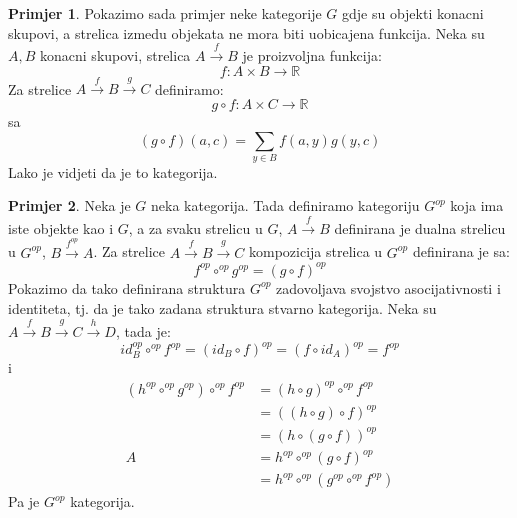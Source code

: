 \documentclass[11pt]{article}
\theoremstyle{definition}
\newtheorem{primjer}{Primjer}
\begin{document}
  \begin{primjer}
    Pokazimo sada primjer neke kategorije $G$ gdje su objekti konacni skupovi,
    a strelica izmedu objekata ne mora biti uobicajena funkcija.
    Neka su $A, B$ konacni skupovi, strelica $A \xrightarrow{f} B$ je
    proizvoljna funkcija:
    \begin{equation*}
      f:A \times B \rightarrow \mathbb{R}
    \end{equation*}
    Za strelice $A \xrightarrow{f} B \xrightarrow{g} C$ definiramo:
    \begin{equation*}
      g \circ f:A \times C \rightarrow \mathbb{R}
    \end{equation*}
    sa
    \begin{equation*}
      (g \circ f)(a, c) = \sum_{y \in B}f(a, y)g(y,c)
    \end{equation*}
    Lako je vidjeti da je to kategorija.  \end{primjer}

  \begin{primjer}
    Neka je $G$ neka kategorija. Tada definiramo kategoriju $G^{op}$ koja ima
    iste objekte kao i $G$, a za svaku strelicu u $G$, $A \xrightarrow{f} B$
    definirana je dualna strelicu u $G^{op}$, $B \xrightarrow{f^{op}} A$.
    Za strelice $A \xrightarrow{f} B \xrightarrow{g} C$ kompozicija strelica
    u $G^{op}$ definirana je sa:
    \begin{equation*}
      f^{op} \circ^{op} g^{op} = (g \circ f)^{op}
    \end{equation*}
    Pokazimo da tako definirana struktura $G^{op}$ zadovoljava svojstvo
    asocijativnosti i identiteta, tj. da je tako zadana struktura stvarno
    kategorija.
    Neka su $A \xrightarrow{f} B \xrightarrow{g} C \xrightarrow{h} D$, tada je:
    \begin{equation*}
      id^{op}_B \circ^{op} f^{op} = (id_B \circ f)^{op} = (f \circ id_A)^{op} =
      f^{op}
    \end{equation*}
    i
    \begin{align*}
      (h^{op} \circ^{op} g^{op}) \circ^{op} f^{op} &= (h \circ g)^{op} \circ^{op} f^{op}\\
      &= ((h \circ g) \circ f)^{op}\\
      &= (h \circ (g \circ f))^{op}\\
      A
      &= h^{op} \circ^{op} (g \circ f)^{op}\\
      &= h^{op} \circ^{op} (g^{op} \circ^{op} f^{op})
    \end{align*}
    Pa je $G^{op}$ kategorija.
  \end{primjer}
\end{document}
